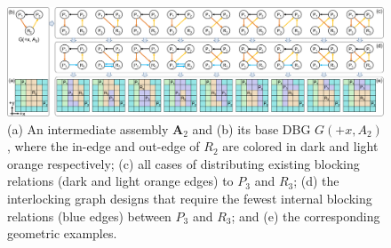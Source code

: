 




\begin{figure}[!t]
	\centering
	\includegraphics[width=17.80cm]{images/Framework_Conceptual.png}
	\vspace*{-2.5mm}
	\caption{
		(a) An intermediate assembly $\mathbf{A}_2$ and 
		(b) its base DBG $G(+x, A_2)$, where the in-edge and out-edge of $R_2$ are colored in dark and light orange respectively;
		(c) all cases of distributing existing blocking relations (dark and light orange edges) to $P_3$ and $R_3$; 
		(d) the interlocking graph designs that require the fewest internal blocking relations (blue edges) between $P_3$ and $R_3$; and
		(e) the corresponding geometric examples.
	}
	\vspace*{-1.0mm}
	\label{fig:Framework_Conceptual}
\end{figure}

